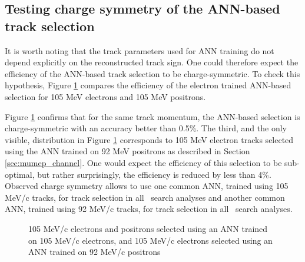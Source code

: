 \subsection{Testing charge symmetry of the ANN-based track selection}

It is worth noting that the track parameters used for ANN training do not depend explicitly
on the reconstructed track sign. One could therefore expect the efficiency of the ANN-based
track selection to be charge-symmetric. To check this hypothesis, Figure \ref{fig:su2020_mva_test_dar}
compares the efficiency of the electron trained ANN-based selection for 105 MeV electrons and 105 MeV positrons.

Figure \ref{fig:su2020_mva_test_dar} confirms that for the same track momentum, the ANN-based selection
is charge-symmetric with an accuracy better than 0.5\%. The third, and the only visible, distribution
in Figure \ref{fig:su2020_mva_test_dar} corresponds to 105 MeV electron tracks selected
using the ANN trained on 92 MeV positrons as described in Section \ref{sec:mumep_channel}. One would expect
the efficiency of this selection to be sub-optimal, but rather surprisingly, the efficiency is reduced by
less than 4\%.
Observed charge symmetry allows to use one common ANN, trained using 105 MeV/c tracks, for track selection
in all \MuToEm\ search analyses and another common ANN, trained using 92 MeV/c tracks, for track selection 
in all \MuToEp\ search analyses.

\begin{figure}
  \caption{
    \label{fig:su2020_mva_test_dar} 
    105 MeV/c electrons and positrons selected using an ANN trained on 105 MeV/c electrons,
    and 105 MeV/c electrons selected using an ANN trained on 92 MeV/c positrons
  }
\end{figure}


